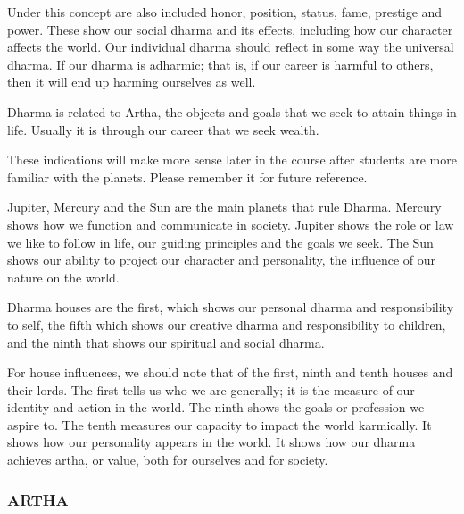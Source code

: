  

Under this concept are also included honor, position, status, fame, prestige and power. These show our social dharma and its effects, including how our character affects the world. Our individual dharma should reflect in some way the universal dharma. If our dharma is adharmic; that is, if our career is harmful to others, then it will end up harming ourselves as well.

 

Dharma is related to Artha, the objects and goals that we seek to attain things in life. Usually it is through our career that we seek wealth.

 

 


 

These indications will make more sense later in the course after students are more familiar with the planets. Please remember it for future reference.

 

Jupiter, Mercury and the Sun are the main planets that rule Dharma. Mercury shows how we function and communicate in society. Jupiter shows the role or law we like to follow in life, our guiding principles and the goals we seek. The Sun shows our ability to project our character and personality, the influence of our nature on the world.

 

Dharma houses are the first, which shows our personal dharma and responsibility to self, the fifth which shows our creative dharma and responsibility to children, and the ninth that shows our spiritual and social dharma.

 

For house influences, we should note that of the first, ninth and tenth houses and their lords. The first tells us who we are generally; it is the measure of our identity and action in the world. The ninth shows the goals or profession we aspire to. The tenth measures our capacity to impact the world karmically. It shows how our personality appears in the world. It shows how our dharma achieves artha, or value, both for ourselves and for society.

 

 

\subsubsection{ARTHA}

